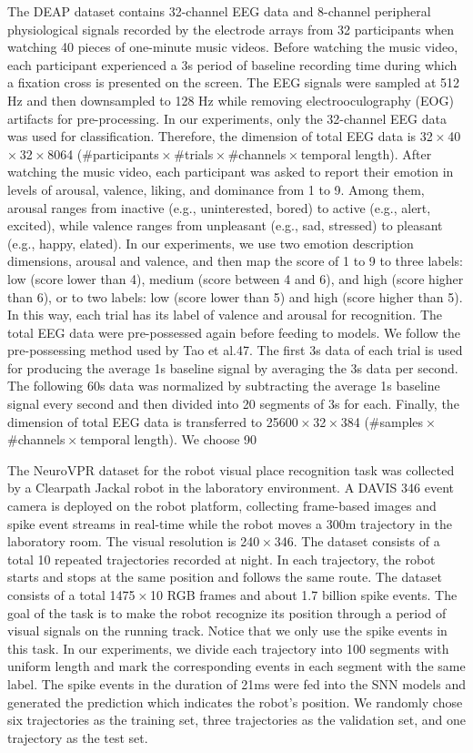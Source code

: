 The DEAP dataset contains 32-channel EEG data and 8-channel peripheral physiological signals recorded by the electrode arrays from 32 participants when watching 40 pieces of one-minute music videos. Before watching the music video, each participant experienced a 3s period of baseline recording time during which a fixation cross is presented on the screen. The EEG signals were sampled at 512 Hz and then downsampled to 128 Hz while removing electrooculography (EOG) artifacts for pre-processing. In our experiments, only the 32-channel EEG data was used for classification. Therefore, the dimension of total EEG data is 32 × 40 × 32 × 8064 (#participants × #trials × #channels × temporal length). After watching the music video, each participant was asked to report their emotion in levels of arousal, valence, liking, and dominance from 1 to 9. Among them, arousal ranges from inactive (e.g., uninterested, bored) to active (e.g., alert, excited), while valence ranges from unpleasant (e.g., sad, stressed) to pleasant (e.g., happy, elated). In our experiments, we use two emotion description dimensions, arousal and valence, and then map the score of 1 to 9 to three labels: low (score lower than 4), medium (score between 4 and 6), and high (score higher than 6), or to two labels: low (score lower than 5) and high (score higher than 5). In this way, each trial has its label of valence and arousal for recognition. The total EEG data were pre-possessed again before feeding to models. We follow the pre-possessing method used by Tao et al.47. The first 3s data of each trial is used for producing the average 1s baseline signal by averaging the 3s data per second. The following 60s data was normalized by subtracting the average 1s baseline signal every second and then divided into 20 segments of 3s for each. Finally, the dimension of total EEG data is transferred to 25600 × 32 × 384 (#samples × #channels × temporal length). We choose 90%

The NeuroVPR dataset for the robot visual place recognition task was collected by a Clearpath Jackal robot in the laboratory environment. A DAVIS 346 event camera is deployed on the robot platform, collecting frame-based images and spike event streams in real-time while the robot moves a 300m trajectory in the laboratory room. The visual resolution is 240 × 346. The dataset consists of a total 10 repeated trajectories recorded at night. In each trajectory, the robot starts and stops at the same position and follows the same route. The dataset consists of a total 1475 × 10 RGB frames and about 1.7 billion spike events. The goal of the task is to make the robot recognize its position through a period of visual signals on the running track. Notice that we only use the spike events in this task. In our experiments, we divide each trajectory into 100 segments with uniform length and mark the corresponding events in each segment with the same label. The spike events in the duration of 21ms were fed into the SNN models and generated the prediction which indicates the robot’s position. We randomly chose six trajectories as the training set, three trajectories as the validation set, and one trajectory as the test set.

